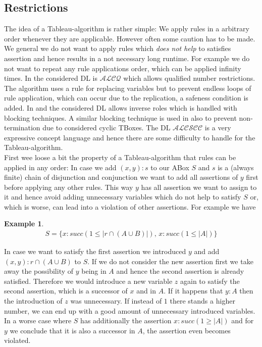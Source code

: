 \documentclass[a4paper,11pt]{scrartcl}
\theoremstyle{break}
\theoremstyle{definition}
\newtheorem{ex}{Example}
\begin{document}
\subsection{Restrictions}\label{restriction}
The idea of a Tableau-algorithm is rather simple: We apply rules in a arbitrary order whenever they are applicable. However often some caution has to be made. We general we do not want to apply rules which \textit{does not help} to satisfies assertion and hence results in a not necessary long runtime. For example we do not want to repeat any rule applications order, which can be applied infinity times. In \cite{1} the considered DL is $\mathcal{ALCQ}$ which allows qualified number restrictions. The algorithm uses a rule for replacing variables but to prevent endless loops of rule application, which can occur due to the replication, a safeness condition is added. In \cite{2} and\cite{6} the considered DL allows inverse roles which is handled with blocking techniques. A similar blocking technique is used in \cite{Ba} also to prevent non-termination due to considered cyclic TBoxes. The DL $\mathcal{ALCSCC}$ is a very expressive concept language and hence there are some difficulty to handle for the Tableau-algorithm.\\
First wee loose a bit the property of a Tableau-algorithm that rules can be applied in any order: In case we add $(x,y):s$ to our ABox $S$ and $s$ is a (always finite) chain of disjunction and conjunction we want to add all assertions of $y$ first before applying any other rules. This way $y$ has all assertion we want to assign to it and hence avoid adding unnecessary variables which do not help to satisfy $S$ or, which is worse, can lead into a violation of other assertions. For example we have
\begin{ex}\label{order}
\begin{align*}
S=\{x:succ(1\leq|r\cap (A\cup B)|),\,x:succ(1\leq |A|)\}
\end{align*}
\end{ex}
In case we want to satisfy the first assertion we introduced $y$ and add $(x,y):r\cap (A\cup B)$ to $S$. If we do not consider the new assertion first we take away the possibility of $y$ being in $A$ and hence the second assertion is already satisfied. Therefore we would introduce a new variable $z$ again to satisfy the second assertion, which is a successor of $x$ and in $A$. If it happens that $y:A$ then the introduction of $z$ was unnecessary. If instead of $1$ there stands a higher number, we can end up with a good amount of unnecessary introduced variables. In a worse case where $S$ has additionally the assertion $x:succ(1\geq |A|)$ and for $y$ we conclude that it is also a successor in $A$, the assertion even becomes violated.\\
\end{document}
